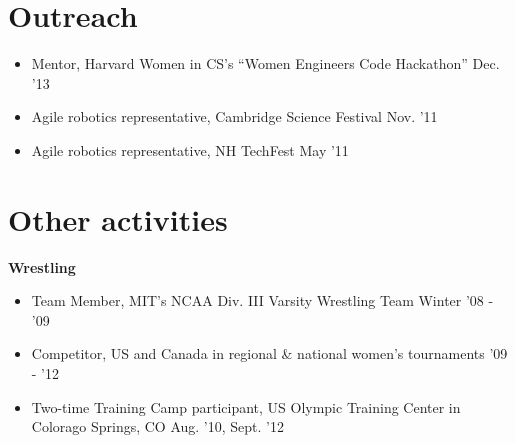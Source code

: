 \documentclass[margin]{res}
\begin{document}
\begin{resume}
%		 
 




\section{Outreach}
\begin{itemize}[leftmargin=*] \itemsep -2pt
\item Mentor, Harvard Women in CS's ``Women Engineers Code Hackathon'' \hfill Dec. '13
\item Agile robotics representative, Cambridge Science Festival \hfill Nov. '11
\item Agile robotics representative, NH TechFest \hfill May '11

\end{itemize}

\section{Other activities}
{\bf Wrestling}
\begin{itemize}[leftmargin=*] \itemsep -2pt
\item Team Member, MIT's NCAA Div. III Varsity Wrestling Team \hfill Winter '08 - '09
\item Competitor, US and Canada in regional \& national women's tournaments \hfill '09 - '12
\item Two-time Training Camp participant, US Olympic Training Center in Colorago Springs, CO \hfill Aug. '10, Sept. '12



\end{itemize}
\end{resume}
\end{document}
